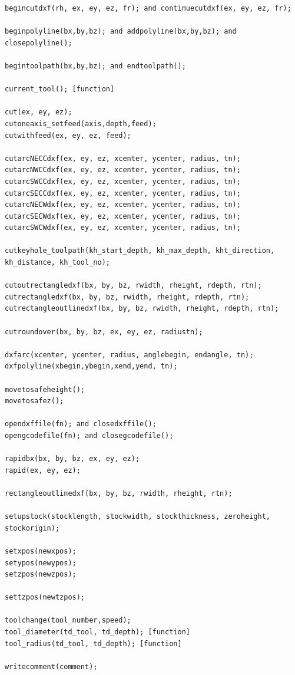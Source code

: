 \documentclass{ltxdoc}
\begin{document}
\begin{verbatim}
begincutdxf(rh, ex, ey, ez, fr); and continuecutdxf(ex, ey, ez, fr);

beginpolyline(bx,by,bz); and addpolyline(bx,by,bz); and closepolyline();

begintoolpath(bx,by,bz); and endtoolpath();

current_tool(); [function]

cut(ex, ey, ez);
cutoneaxis_setfeed(axis,depth,feed);
cutwithfeed(ex, ey, ez, feed);

cutarcNECCdxf(ex, ey, ez, xcenter, ycenter, radius, tn);
cutarcNWCCdxf(ex, ey, ez, xcenter, ycenter, radius, tn);
cutarcSWCCdxf(ex, ey, ez, xcenter, ycenter, radius, tn);
cutarcSECCdxf(ex, ey, ez, xcenter, ycenter, radius, tn);
cutarcNECWdxf(ex, ey, ez, xcenter, ycenter, radius, tn);
cutarcSECWdxf(ex, ey, ez, xcenter, ycenter, radius, tn);
cutarcSWCWdxf(ex, ey, ez, xcenter, ycenter, radius, tn);

cutkeyhole_toolpath(kh_start_depth, kh_max_depth, kht_direction, kh_distance, kh_tool_no);

cutoutrectangledxf(bx, by, bz, rwidth, rheight, rdepth, rtn);
cutrectangledxf(bx, by, bz, rwidth, rheight, rdepth, rtn);
cutrectangleoutlinedxf(bx, by, bz, rwidth, rheight, rdepth, rtn);

cutroundover(bx, by, bz, ex, ey, ez, radiustn);

dxfarc(xcenter, ycenter, radius, anglebegin, endangle, tn);
dxfpolyline(xbegin,ybegin,xend,yend, tn);

movetosafeheight();
movetosafez();

opendxffile(fn); and closedxffile();
opengcodefile(fn); and closegcodefile();

rapidbx(bx, by, bz, ex, ey, ez);
rapid(ex, ey, ez);

rectangleoutlinedxf(bx, by, bz, rwidth, rheight, rtn);

setupstock(stocklength, stockwidth, stockthickness, zeroheight, stockorigin);

setxpos(newxpos);
setypos(newypos);
setzpos(newzpos);

settzpos(newtzpos);

toolchange(tool_number,speed);
tool_diameter(td_tool, td_depth); [function]
tool_radius(td_tool, td_depth); [function]

writecomment(comment);
\end{verbatim}
\end{document}
